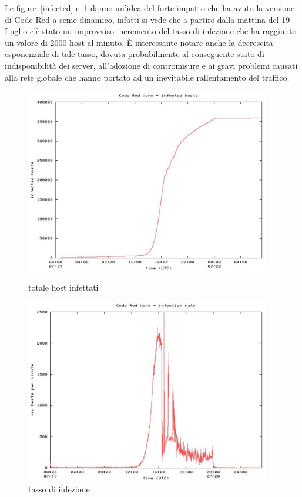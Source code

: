 Le figure~\ref{infected} e~\ref{rate} danno un’idea del forte impatto che ha avuto la versione di Code Red a seme dinamico, infatti si vede che a partire dalla mattina del 19 Luglio c’è stato un improvviso incremento del tasso di infezione che ha raggiunto un valore di 2000 host al minuto. È interessante notare anche la decrescita esponenziale di tale tasso, dovuta probabilmente al conseguente stato di indisponibilità dei server, all’adozione di contromisure e ai gravi problemi causati alla rete globale che hanno portato ad un inevitabile rallentamento del traffico.\\
\begin{figure}
    \centering
    \begin{minipage}{0.5\textwidth}
        \centering
        \includegraphics[width=0.95\textwidth]{images/infected} %
        \caption{totale host infettati}
        \label{infected}
    \end{minipage}\hfill
    \begin{minipage}{0.5\textwidth}
        \centering
        \includegraphics[width=0.95\textwidth]{images/infection_rate} %
        \caption{tasso di infezione}
        \label{rate}
    \end{minipage}
\end{figure}
